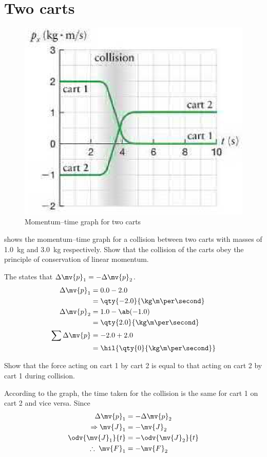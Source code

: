 \section{Two carts}
\begin{figure}
  \includegraphics[scale=0.5]{assets/momentumgraph.png}
  \caption{Momentum--time graph for two carts}
  \label{fig:twocarts}
\end{figure}
\begin{problem}
   shows the momentum--time graph for a
  collision between
  two carts with masses of \qty{1.0}{\kg} and \qty{3.0}{\kg} respectively.
  Show that the collision of the carts obey the principle of conservation
  of linear momentum.
\end{problem}

The  states that
\(\Delta\mv{p}_1 = -\Delta\mv{p}_2\).
\begin{align*}
  \Delta\mv{p}_1 &= 0.0 - 2.0 \\
  &= \qty{-2.0}{\kg\m\per\second} \\
  \Delta\mv{p}_2 &= 1.0 - \ab(-1.0) \\
  &= \qty{2.0}{\kg\m\per\second} \\
  \sum\Delta\mv{p} &= -2.0 + 2.0 \\
  &= \hil{\qty{0}{\kg\m\per\second}}
\end{align*}

\begin{problem}
  Show that the force acting on cart 1 by cart 2 is equal to that
  acting on cart 2 by cart 1 during collision.
\end{problem}
According to the graph, the time taken for the collision is the same
for cart 1 on cart 2 and vice versa. Since
\begin{align*}
  \Delta\mv{p}_1 &= -\Delta\mv{p}_2 \\
  \Rightarrow \mv{J}_1 &= -\mv{J}_2 \\
  \odv{\mv{J}_1}{t} &= -\odv{\mv{J}_2}{t} \\
  \therefore\; \mv{F}_1 &= -\mv{F}_2
\end{align*}

